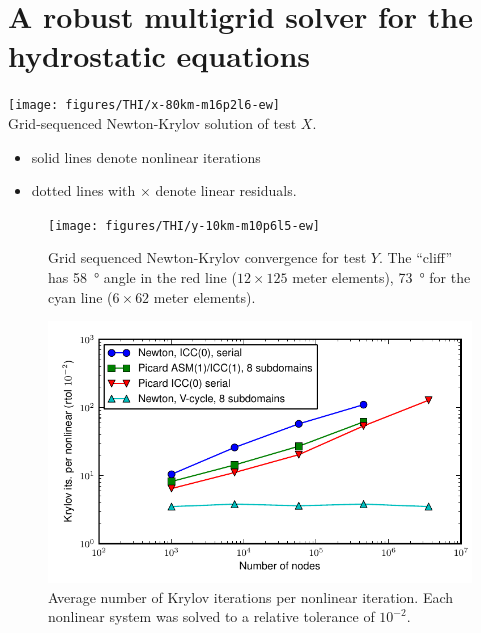 \documentclass{beamer}
\begin{document}
\section[Hydrostatic]{A robust multigrid solver for the hydrostatic equations}

\begin{frame}
  \texttt{[image: figures/THI/x-80km-m16p2l6-ew]} \\
  Grid-sequenced Newton-Krylov solution of test $X$. \\
  \begin{itemize}
  \item solid lines denote nonlinear iterations
  \item dotted lines with $\times$ denote linear residuals.
  \end{itemize}
\end{frame}

\begin{frame}
  \begin{figure}
    \texttt{[image: figures/THI/y-10km-m10p6l5-ew]}
    \centering\caption{Grid sequenced Newton-Krylov convergence for test $Y$.
    The ``cliff'' has \SI{58}{\degree} angle in the red line ($12\times 125$ meter elements), \SI{73}{\degree} for the cyan line ($6\times 62$ meter elements).}\label{fig:testy}
  \end{figure}
\end{frame}
\begin{frame}
  \begin{figure}
    \includegraphics[width=\textwidth]{figures/THI/linear4}
    \centering\caption{Average number of Krylov iterations per nonlinear iteration.  Each nonlinear system was solved to a relative tolerance of $10^{-2}$.}\label{fig:linear}
  \end{figure}
\end{frame}
\end{document}
